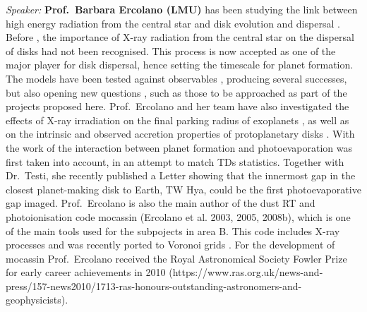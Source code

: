 \documentclass[10pt,fleqn,twoside]{article}
\begin{document}
{\it Speaker: }{\bf Prof.\ Barbara Ercolano (LMU)} has been studying the link between high
energy radiation from the central star and disk evolution and
dispersal \citep[e.g.,][]{2008ApJ...688..398E, 2009ApJ...699.1639E,
2010MNRAS.401.1415O, 2011MNRAS.412...13O, 2012MNRAS.422.1880O}. 
Before \citet{2009ApJ...699.1639E}, the importance
of X-ray radiation from the central star on the dispersal of disks had
not been recognised. This process is now accepted as one of the major
player for disk dispersal, hence setting the timescale for planet
formation. The models have been tested against observables
\citep[e.g.][]{2010MNRAS.406.1553E, 2013MNRAS.434.3378O, 2013MNRAS.428.3327K,
2015MNRAS.452.3689E}, producing
several successes, but also opening new questions 
\citep[e.g.,][]{2016MNRAS.460.3472E}, such as those to be
approached as part of the projects proposed here. Prof.\ Ercolano and
her team have also investigated the effects of X-ray irradiation on
the final parking radius of exoplanets \citep{2015MNRAS.450.3008E}, as
well as on the intrinsic \citep{2013MNRAS.436.3446E, 2013ApJ...764...65M}
and observed
accretion properties of protoplanetary disks \citep{2014MNRAS.439..256E}. 
With the work of \citet{2013MNRAS.430.1392R, 2015MNRAS.454.2173R} 
the interaction between planet formation and photoevaporation was first
taken into account, in an attempt to match TDs
statistics. Together with Dr.\ Testi, she recently published a Letter
showing that the innermost gap in the closest planet-making disk to
Earth, TW Hya, could be the first photoevaporative gap
imaged. Prof.\ Ercolano is also the main author of the dust RT and 
photoionisation code {\sc mocassin} (Ercolano et al. 2003, 2005,
2008b), which is one of the main tools
used for the subpojects in area B. This code includes X-ray processes
and was recently ported to Voronoi grids \citep{2016MNRAS.456..756H}. 
For the development of {\sc
  mocassin} Prof.\ Ercolano received the Royal Astronomical Society
Fowler Prize for early career achievements in 2010 (https://www.ras.org.uk/news-and-press/157-news2010/1713-ras-honours-outstanding-astronomers-and-geophysicists). \\
\end{document}
